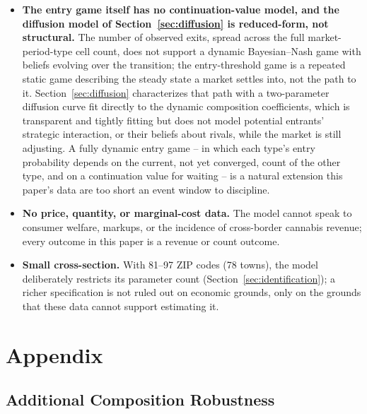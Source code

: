 \documentclass[english,12pt]{article}
\begin{document}
\begin{itemize}
\item \textbf{The entry game itself has no continuation-value model, and the diffusion model of Section~\ref{sec:diffusion} is reduced-form, not structural.} The number of observed exits, spread across the full market-period-type cell count, does not support a dynamic Bayesian--Nash game with beliefs evolving over the transition; the entry-threshold game is a repeated static game describing the steady state a market settles into, not the path to it. Section~\ref{sec:diffusion} characterizes that path with a two-parameter diffusion curve fit directly to the dynamic composition coefficients, which is transparent and tightly fitting but does not model potential entrants' strategic interaction, or their beliefs about rivals, while the market is still adjusting. A fully dynamic entry game -- in which each type's entry probability depends on the current, not yet converged, count of the other type, and on a continuation value for waiting -- is a natural extension this paper's data are too short an event window to discipline.
\item \textbf{No price, quantity, or marginal-cost data.} The model cannot speak to consumer welfare, markups, or the incidence of cross-border cannabis revenue; every outcome in this paper is a revenue or count outcome.
\item \textbf{Small cross-section.} With 81--97 ZIP codes (78 towns), the model deliberately restricts its parameter count (Section~\ref{sec:identification}); a richer specification is not ruled out on economic grounds, only on the grounds that these data cannot support estimating it.
\end{itemize}

\newpage

\appendix
\section{Appendix}
\renewcommand{\thetable}{A.\arabic{table}}
\renewcommand{\thefigure}{A.\arabic{figure}}
\renewcommand{\theequation}{A.\arabic{equation}}
\setcounter{table}{0}
\setcounter{figure}{0}
\setcounter{equation}{0}

\subsection{Additional Composition Robustness}
\label{app:composition}

\begin{table}[htbp]
\centering\footnotesize

\caption{Composition result with Albuquerque included versus excluded from the pooled-control (legal-border $+$ interior) sample, full zero-inclusive 368-ZIP-code panel, inverse hyperbolic sine transformation. Albuquerque is interior by construction, so it does not affect the main (nonlegal- vs.\ always-legal-border) comparison.}
\label{tab:fact3abq}
\end{table}
\end{document}
